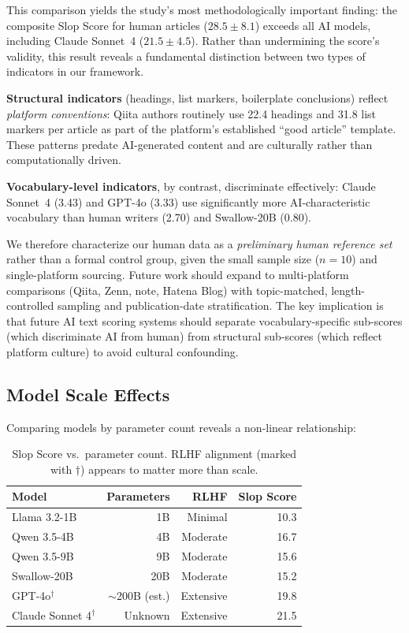 \documentclass[11pt,a4paper]{article}
\begin{document}
This comparison yields the study's most methodologically important finding: the composite Slop Score for human articles ($28.5 \pm 8.1$) exceeds all AI models, including Claude Sonnet~4 ($21.5 \pm 4.5$). Rather than undermining the score's validity, this result reveals a fundamental distinction between two types of indicators in our framework.

\textbf{Structural indicators} (headings, list markers, boilerplate conclusions) reflect \textit{platform conventions}: Qiita authors routinely use 22.4 headings and 31.8 list markers per article as part of the platform's established ``good article'' template. These patterns predate AI-generated content and are culturally rather than computationally driven.

\textbf{Vocabulary-level indicators}, by contrast, discriminate effectively: Claude Sonnet~4 (3.43) and GPT-4o (3.33) use significantly more AI-characteristic vocabulary than human writers (2.70) and Swallow-20B (0.80).

We therefore characterize our human data as a \textit{preliminary human reference set} rather than a formal control group, given the small sample size ($n = 10$) and single-platform sourcing. Future work should expand to multi-platform comparisons (Qiita, Zenn, note, Hatena Blog) with topic-matched, length-controlled sampling and publication-date stratification. The key implication is that future AI text scoring systems should separate vocabulary-specific sub-scores (which discriminate AI from human) from structural sub-scores (which reflect platform culture) to avoid cultural confounding.

\subsection{Model Scale Effects}

Comparing models by parameter count reveals a non-linear relationship:

\begin{table}[H]
\centering
\caption{Slop Score vs.\ parameter count. RLHF alignment (marked with $\dagger$) appears to matter more than scale.}
\label{tab:scale}
\begin{tabular}{lrrr}
\toprule
\textbf{Model} & \textbf{Parameters} & \textbf{RLHF} & \textbf{Slop Score} \\
\midrule
Llama 3.2-1B & 1B & Minimal & 10.3 \\
Qwen 3.5-4B & 4B & Moderate & 16.7 \\
Qwen 3.5-9B & 9B & Moderate & 15.6 \\
Swallow-20B & 20B & Moderate & 15.2 \\
GPT-4o$^\dagger$ & $\sim$200B (est.) & Extensive & 19.8 \\
Claude Sonnet 4$^\dagger$ & Unknown & Extensive & 21.5 \\
\bottomrule
\end{tabular}
\end{table}
\end{document}
